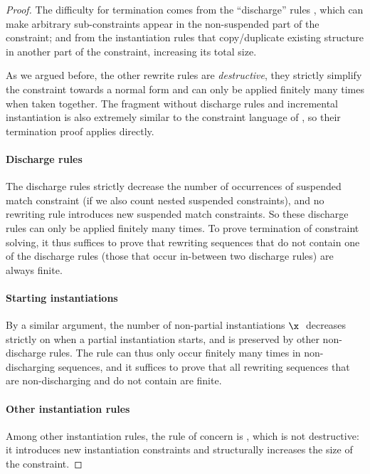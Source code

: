 \documentclass[acmsmall,screen,nonacm,review]{acmart}
\begin{document}
\termination
\begin{proof}
  The difficulty for termination comes from the ``discharge'' rules
  ,  which can make arbitrary
  sub-constraints appear in the non-suspended part of the constraint;
  and from the instantiation rules that copy/duplicate existing
  structure in another part of the constraint, increasing its total
  size.

  As we argued before, the other rewrite rules are \emph{destructive},
  they strictly simplify the constraint towards a normal form and can
  only be applied finitely many times when taken together. The
  fragment without discharge rules and incremental instantiation is
  also extremely similar to the constraint language of
  \citet*{Pottier-Remy/emlti}, so their termination proof applies
  directly.

  \paragraph{Discharge rules} The discharge rules strictly decrease
  the number of occurrences of suspended match constraint (if we also
  count nested suspended constraints), and no rewriting rule
  introduces new suspended match constraints. So these discharge rules
  can only be applied finitely many times. To prove termination of
  constraint solving, it thus suffices to prove that rewriting
  sequences that do not contain one of the discharge rules (those that
  occur in-between two discharge rules) are always finite.

  \paragraph{Starting instantiations} By a similar argument, the number
  of non-partial instantiations $\capp \x \t$ decreases strictly on
   when a partial instantiation starts, and is
  preserved by other non-discharge rules. The rule 
  can thus only occur finitely many times in non-discharging sequences,
  and it suffices to prove that all rewriting sequences that are
  non-discharging and do not contain  are finite.

  \paragraph{Other instantiation rules} Among other instantiation
  rules, the rule of concern is , which is not
  destructive: it introduces new instantiation constraints
  and structurally increases the size of the constraint.


\end{proof}
\end{document}

